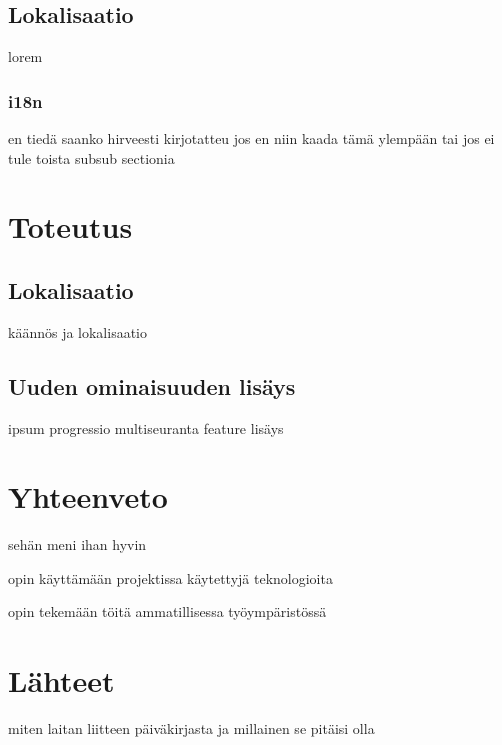 \documentclass[11pt,a4paper,titlepage,oneside]{article}
\begin{document}
\subsection{Lokalisaatio}
lorem

\subsubsection{i18n}
en tiedä saanko hirveesti kirjotatteu
jos en niin kaada tämä ylempään
tai jos ei tule toista subsub sectionia










\newpage
\section{Toteutus}              %


\subsection{Lokalisaatio}
käännös ja lokalisaatio


\subsection{Uuden ominaisuuden lisäys}
ipsum progressio multiseuranta feature lisäys



\section{Yhteenveto}

sehän meni ihan hyvin 

opin käyttämään projektissa käytettyjä teknologioita

opin tekemään töitä ammatillisessa työympäristössä




\newpage
\section{Lähteet}               %

miten laitan liitteen päiväkirjasta ja millainen se pitäisi olla
\end{document}
